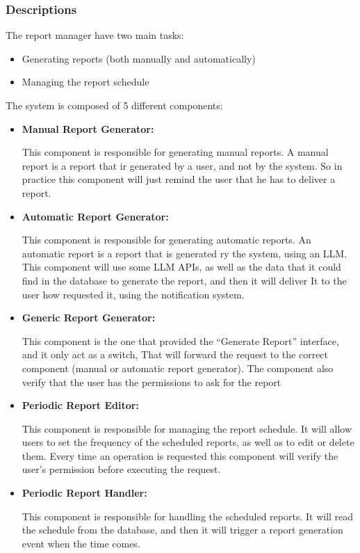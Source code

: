 \documentclass{article}
\begin{document}
\subsubsection{Descriptions}
The report manager have two main tasks:
\begin{itemize}
    \item Generating reports (both manually and automatically) 
    \item Managing the report schedule 
\end{itemize}

The system is composed of 5 different components:

\begin{itemize}
    \item \textbf{Manual Report Generator: }

    This component is responsible for generating manual reports. A manual report is a report that ir generated by a user, and not by the system.
    So in practice this component will just remind the user that he has to deliver a report.
    \item \textbf{Automatic Report Generator: }

    This component is responsible for generating automatic reports. An automatic report is a report that is generated ry the system,
    using an LLM. This component will use some LLM APIs, as well as the data that it could find in the database to generate the report, and then it will deliver It
    to the user how requested it, using the notification system.

    \item \textbf{Generic Report Generator: }
    
    This component is the one that provided the ``Generate Report'' interface, and it only act as a switch, That 
    will forward the request to the correct component (manual or automatic report generator).
    The component also verify that the user has the permissions to ask for the report

    \item \textbf{Periodic Report Editor: }

    This component is responsible for managing the report schedule.
    It will allow users to set the frequency of the scheduled reports, as well as to edit or delete them.
    Every time an operation is requested this component will verify the user's permission before executing the request.

    \item \textbf{Periodic Report Handler: }
    
    This component is responsible for handling the scheduled reports.
    It will read the schedule from the database, and then it will trigger a report generation event when the time comes.

\end{itemize}
\end{document}
